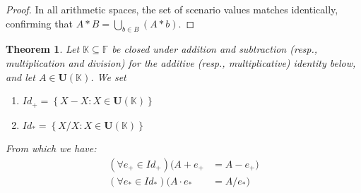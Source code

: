 \documentclass[a4paper,12pt,twoside]{memoir}
\newtheorem{theorem}{Theorem}[chapter]
\newcommand{\set}[1]{\left\{#1\right\}} %
\newcommand{\tsbd}[1]{\mathbf{U}(\mathbb{#1})}
\begin{document}
\begin{proof}
		In all arithmetic spaces, the set of scenario values matches identically, confirming that $A * B = \bigcup_{b \in B} (A * b)$.
	\end{proof}
	\begin{theorem}
		Let $\mathbb{K} \subseteq \mathbb{F}$ be closed under addition and subtraction (resp., multiplication and division) for the additive (resp., multiplicative) identity below, and let $A \in \tsbd{K}$. We set
		\begin{enumerate}[leftmargin=*]
			\item $Id_+=\set{X-X: X \in \tsbd{K}}$
			\item $Id_*=\set{X/X: X \in \tsbd{K}}$
		\end{enumerate}
		From which we have:
		\begin{align*}
			(\forall e_+ \in Id_+)(A + e_+     & = A - e_+)  \\
			(\forall e_* \in Id_*)(A \cdot e_* & = A / e_*)
		\end{align*}
	\end{theorem}
\end{document}
